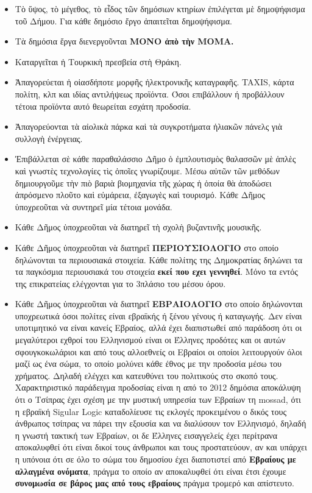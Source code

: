 \documentclass[a4paper]{article}
\begin{document}
\begin{itemize}
\item Τὸ ὕψος, τὸ μέγεθος, τὸ εἶδος τῶν δημόσιων κτηρίων ἐπιλέγεται μὲ δημοψήφισμα τοῦ Δήμου. Για κάθε δημόσιο ἔργο ἀπαιτεῖται δημοψήφισμα.
\item Τὰ δημόσια ἔργα διενεργοῦνται \textbf{ΜΟΝΟ ἀπὸ τὴν ΜΟΜΑ.}
\item Καταργεῖται ἡ Τουρκικὴ πρεσβεία στὴ Θράκη.
\item Ἀπαγορεύεται ἡ οἱασδήποτε μορφῆς ἠλεκτρονικῆς καταγραφῆς. TAXIS, κάρτα πολίτη, κλπ και ιδίας αντιλήψεως προϊόντα. Όσοι επιβάλλουν ή προβάλλουν τέτοια προϊόντα αυτό θεωρείται εσχάτη προδοσία.
\item Ἀπαγορεύονται τὰ αἰολικὰ πάρκα καὶ τὰ συγκροτήματα ἡλιακῶν πάνελς γιὰ συλλογὴ ἐνέργειας.
\item Ἐπιβάλλεται σὲ κάθε παραθαλάσσιο Δῆμο ὁ ἐμπλουτισμὸς θαλασσῶν μὲ ἁπλὲς καὶ γνωστὲς τεχνολογίες τὶς ὁποῖες γνωρίζουμε. Μέσω αὐτῶν τῶν μεθόδων δημιουργοῦμε τὴν πιὸ βαριὰ βιομηχανία τῆς χώρας ἡ ὁποία θὰ ἀποδώσει ἀπρόσμενο πλοῦτο καὶ εὐμάρεια, ἐξαγωγὲς καὶ τουρισμό. Κάθε Δῆμος ὑποχρεοῦται νὰ συντηρεῖ μία τέτοια μονάδα.
\item Κάθε Δῆμος ὑποχρεοῦται νὰ διατηρεῖ τὴ σχολὴ βυζαντινῆς μουσικῆς.
\item Κάθε Δῆμος ὑποχρεοῦται νὰ διατηρεῖ \textbf{ΠΕΡΙΟΥΣΙΟΛΟΓΙΟ} στο οποίο δηλώνονται τα περιουσιακά στοιχεία. Κάθε πολίτης της Δημοκρατίας δηλώνει τα τα παγκόσμια περιουσιακά του στοιχεία \textbf{εκεί που εχει γεννηθεί}. Μόνο τα εντός της επικρατείας ελέγχονται για το 3πλάσιο του μέσου όρου.
\item Κάθε Δῆμος ὑποχρεοῦται νὰ διατηρεῖ \textbf{ΕΒΡΑΙΟΛΟΓΙΟ} στο οποίο δηλώνονται υποχρεωτικά όσοι πολίτες είναι εβραϊκής ή ξένου γένους ή καταγωγής. 
Δεν είναι υποτιμητικό να είναι κανείς Εβραίος, αλλά έχει διαπιστωθεί από παράδοση ότι οι μεγαλύτεροι εχθροί του Ελληνισμού είναι οι Έλληνες προδότες και οι αυτών σφουγκοκωλάριοι και από τους αλλοεθνείς οι Εβραίοι οι οποίοι λειτουργούν όλοι μαζί ως ένα σώμα, το οποίο μολύνει κάθε έθνος με την προδοσία μέσω του χρήματος. Δηλαδή ελέγχει και κατευθύνει του πολιτικούς στο σκοπό τους. \\ Χαρακτηριστικό παράδειγμα προδοσίας είναι η από το 2012 δημόσια αποκάλυψη ότι ο Τσίπρας έχει σχέση με την μυστική υπηρεσία των Εβραίων τη mossad, ότι η εβραϊκή Sigular Logic καταδολίευσε τις εκλογές προκειμένου ο δικός τους άνθρωπος τσίπρας να πάρει την εξουσία και να διαλύσουν τον Ελληνισμό, δηλαδή η γνωστή τακτική των Εβραίων, οι δε Έλληνες εισαγγελείς έχει περίτρανα αποκαλυφθεί ότι είναι δικοί τους άνθρωποι και τους προστατεύουν, αν και υπάρχει η υπόνοια ότι σε όλο το σώμα του δημοσίου έχει διαποτιστεί από \textbf{Εβραίους με αλλαγμένα ονόματα}, πράγμα το οποίο αν αποκαλυφθεί ότι είναι έτσι έχουμε \textbf{συνομωσία σε βάρος μας από τους εβραίους} πράγμα τρομερό και απίστευτο.

\end{itemize}
\end{document}
